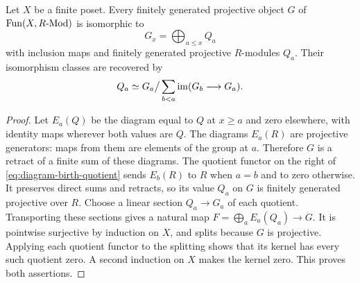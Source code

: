 \begin{lemma}
\label{lem:projective-poset-diagrams}
Let $X$ be a finite poset. Every finitely generated projective object
$G$ of $\operatorname{Fun}(X,R\text{-}\mathrm{Mod})$ is isomorphic to
\[
 G_x=\bigoplus_{a\le x}Q_a
\]
with inclusion maps and finitely generated projective $R$-modules $Q_a$.
Their isomorphism classes are recovered by
\begin{equation}\label{eq:diagram-birth-quotient}
 Q_a\simeq G_a\big/\sum_{b<a}\operatorname{im}(G_b\longrightarrow G_a).
\end{equation}
\end{lemma}
\begin{proof}
Let $E_a(Q)$ be the diagram equal to $Q$ at $x\ge a$ and zero elsewhere,
with identity maps wherever both values are $Q$. The diagrams $E_a(R)$
are projective generators: maps from them are elements of the group
at $a$. Therefore $G$ is a retract of a finite sum of these diagrams.
The quotient functor on the right of
\eqref{eq:diagram-birth-quotient} sends $E_b(R)$ to $R$ when $a=b$
and to zero otherwise. It preserves direct sums and retracts, so its
value $Q_a$ on $G$ is finitely generated projective over $R$.
Choose a linear section $Q_a\to G_a$ of each quotient. Transporting
these sections gives a natural map $F=\bigoplus_aE_a(Q_a)\to G$.
It is pointwise surjective by induction on $X$, and splits because
$G$ is projective. Applying each quotient functor to the splitting
shows that its kernel has every such quotient zero. A second induction
on $X$ makes the kernel zero. This proves both assertions.
\end{proof}

